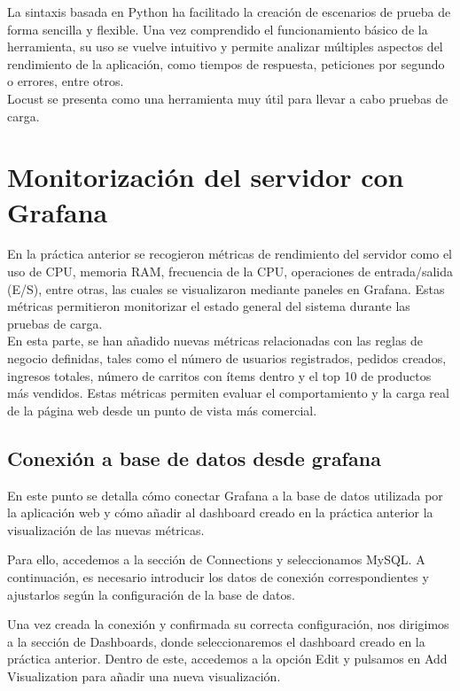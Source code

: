 \documentclass[10pt]{book}
\begin{document}
La sintaxis basada en Python ha facilitado la creación de escenarios de prueba de forma sencilla y flexible. Una vez comprendido el funcionamiento básico de la herramienta, su uso se vuelve intuitivo y permite analizar múltiples aspectos del rendimiento de la aplicación, como tiempos de respuesta, peticiones por segundo o errores, entre otros.\\

Locust se presenta como una herramienta muy útil para llevar a cabo pruebas de carga.\\


\chapter{Monitorización del servidor con Grafana}
En la práctica anterior se recogieron métricas de rendimiento del servidor como el uso de CPU, memoria RAM, frecuencia de la CPU, operaciones de entrada/salida (E/S), entre otras, las cuales se visualizaron mediante paneles en Grafana. Estas métricas permitieron monitorizar el estado general del sistema durante las pruebas de carga.\\

En esta parte, se han añadido nuevas métricas relacionadas con las reglas de negocio definidas, tales como el número de usuarios registrados, pedidos creados, ingresos totales, número de carritos con ítems dentro y el top 10 de productos más vendidos. Estas métricas permiten evaluar el comportamiento y la carga real de la página web desde un punto de vista más comercial.

\section{Conexión a base de datos desde grafana}
En este punto se detalla cómo conectar Grafana a la base de datos utilizada por la aplicación web y cómo añadir al dashboard creado en la práctica anterior la visualización de las nuevas métricas.

Para ello, accedemos a la sección de Connections y seleccionamos MySQL. A continuación, es necesario introducir los datos de conexión correspondientes y ajustarlos según la configuración de la base de datos.

Una vez creada la conexión y confirmada su correcta configuración, nos dirigimos a la sección de Dashboards, donde seleccionaremos el dashboard creado en la práctica anterior. Dentro de este, accedemos a la opción Edit y pulsamos en Add Visualization para añadir una nueva visualización.
\end{document}
